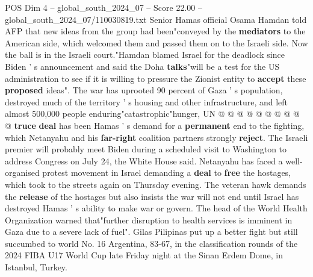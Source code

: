 \begin{textsample}{POS Dim 4 – global\_south\_2024\_07 – Score 22.00 – global\_south\_2024\_07/110030819.txt}
Senior Hamas official Osama Hamdan told AFP that new ideas from the group had been"conveyed by the \textbf{mediators} to the American side, which welcomed them and passed them on to the Israeli side.
Now the ball is in the Israeli court."Hamdan blamed Israel for the deadlock since Biden ' s announcement and said the Doha \textbf{talks}"will be a test for the US administration to see if it is willing to pressure the Zionist entity to \textbf{accept} these \textbf{proposed} ideas".
The war has uprooted 90 percent of Gaza ' s population, destroyed much of the territory ' s housing and other infrastructure, and left almost 500,000 people enduring"catastrophic"hunger, UN @ @ @ @ @ @ @ @ @ @ \textbf{truce} \textbf{deal} has been Hamas ' s demand for a \textbf{permanent} end to the fighting, which Netanyahu and his \textbf{far-right} coalition partners strongly \textbf{reject}.
The Israeli premier will probably meet Biden during a scheduled visit to Washington to address Congress on July 24, the White House said.
Netanyahu has faced a well-organised protest movement in Israel demanding a \textbf{deal} to \textbf{free} the hostages, which took to the streets again on Thursday evening.
The veteran hawk demands the \textbf{release} of the hostages but also insists the war will not end until Israel has destroyed Hamas ' s ability to make war or govern.
The head of the World Health Organization warned that"further disruption to health services is imminent in Gaza due to a severe lack of fuel".
Gilas Pilipinas put up a better fight but still succumbed to world No. 16 Argentina, 83-67, in the classification rounds of the 2024 FIBA U17 World Cup late Friday night at the Sinan Erdem Dome, in Istanbul, Turkey.

\end{textsample}
